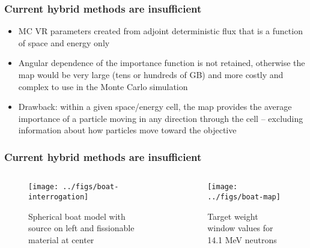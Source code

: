 \documentclass[xcolor=x11names,compress]{beamer}
\renewcommand{\(}{\begin{columns}}
\renewcommand{\)}{\end{columns}}
\newcommand{\<}[1]{\begin{column}{#1}}
\renewcommand{\>}{\end{column}}
\begin{document}
\begin{frame}[fragile]
  \frametitle{Current hybrid methods are insufficient}

	\begin{itemize}
	\item MC VR parameters created from adjoint deterministic flux that is a function of space and energy only \vspace*{1 em}
	\item Angular dependence of the importance function is not retained, otherwise the map would be very large (tens or hundreds of GB) and more costly and complex to use in the Monte Carlo simulation \vspace*{1 em}
	\item Drawback: within a given space/energy cell, the map provides the average importance of a particle moving in any direction through the cell -- excluding information about how particles move toward the objective
	\end{itemize}

\end{frame}

\begin{frame}[fragile]
  \frametitle{Current hybrid methods are insufficient}

	\begin{columns}
  	\begin{column}{0.5\textwidth}
 	 \begin{center}
 	 \begin{figure}
 	 \texttt{[image: ../figs/boat-interrogation]}  
 	 \caption{Spherical boat model with source on left and fissionable material at center}
 	 \end{figure}
 	 \end{center}
  	\end{column}
 	\begin{column}{0.5\textwidth}
 	 \begin{center}
 	 \begin{figure}
 	 \texttt{[image: ../figs/boat-map]}  
 	 \caption{Target weight window values for 14.1 MeV neutrons}
 	 \end{figure}
 	 \end{center}
  	\end{column}
	\end{columns}

\end{frame}
\end{document}
